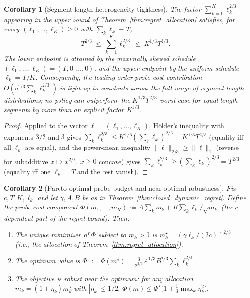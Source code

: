 \documentclass[11pt]{article}
\newtheorem{corollary}{Corollary}
\begin{document}
\begin{corollary}[Segment-length heterogeneity tightness]
\label{cor:segment_heterogeneity}
The factor $\sum_{k=1}^K\ell_k^{2/3}$ appearing in the upper bound of
Theorem~\ref{thm:regret_allocation} satisfies, for every
$(\ell_1,\ldots,\ell_K)\ge 0$ with $\sum_k\ell_k=T$,
\[
  T^{2/3}\ \le\ \sum_{k=1}^K\ell_k^{2/3}\ \le\ K^{1/3}T^{2/3}.
\]
The lower endpoint is attained by the maximally skewed schedule
$(\ell_1,\ldots,\ell_K)=(T,0,\ldots,0)$, and the upper endpoint by the
uniform schedule $\ell_k=T/K$.  Consequently, the leading-order
probe-cost contribution $\widetilde O(c^{1/3}\sum_k\ell_k^{2/3})$ is tight
up to constants across the full range of segment-length distributions; no
policy can outperform the $K^{1/3}T^{2/3}$ worst case for equal-length
segments by more than an explicit factor $K^{1/3}$.
\end{corollary}

\begin{proof}
Applied to the vector $\ell=(\ell_1,\ldots,\ell_K)$, H\"older's inequality
with exponents $3/2$ and $3$ gives
$\sum_k\ell_k^{2/3}\le K^{1/3}(\sum_k\ell_k)^{2/3}=K^{1/3}T^{2/3}$
(equality iff all $\ell_k$ are equal), and the power-mean inequality
$\|\ell\|_{2/3}\ge\|\ell\|_1$ (reverse for subadditive $x\mapsto x^{2/3}$,
$x\ge 0$ concave) gives $\sum_k\ell_k^{2/3}\ge(\sum_k\ell_k)^{2/3}=T^{2/3}$
(equality iff one $\ell_k=T$ and the rest vanish).
\end{proof}

\begin{corollary}[Pareto-optimal probe budget and near-optimal robustness]
\label{cor:pareto_budget}
Fix $c,T,K,\ell_k$ and let $\gamma,A,B$ be as in
Theorem~\ref{thm:closed_dynamic_regret}.  Define the
\emph{probe-cost component}
$\Phi(m_1,\ldots,m_K):=A\sum_k m_k+B\sum_k\ell_k/\sqrt{m_k}$
(the $c$-dependent part of the regret bound).  Then:
\begin{enumerate}[label=(\roman*),leftmargin=1.5em,nosep]
\item The unique minimizer of $\Phi$ subject to $m_k>0$ is
$m_k^\star=(\gamma\ell_k/(2c))^{2/3}$ (i.e., the allocation of
Theorem~\ref{thm:regret_allocation}).
\item The optimum value is
$\Phi^\star:=\Phi(m^\star)=\tfrac{3}{2^{2/3}}A^{1/3}B^{2/3}\sum_k\ell_k^{2/3}$.
\item The objective is \emph{robust} near the optimum: for any allocation
$m_k=(1+\eta_k)m_k^\star$ with $|\eta_k|\le 1/2$,
$\Phi(m)\le\Phi^\star\bigl(1+\tfrac{1}{3}\max_k\eta_k^2\bigr)$.
\end{enumerate}
\end{corollary}
\end{document}
